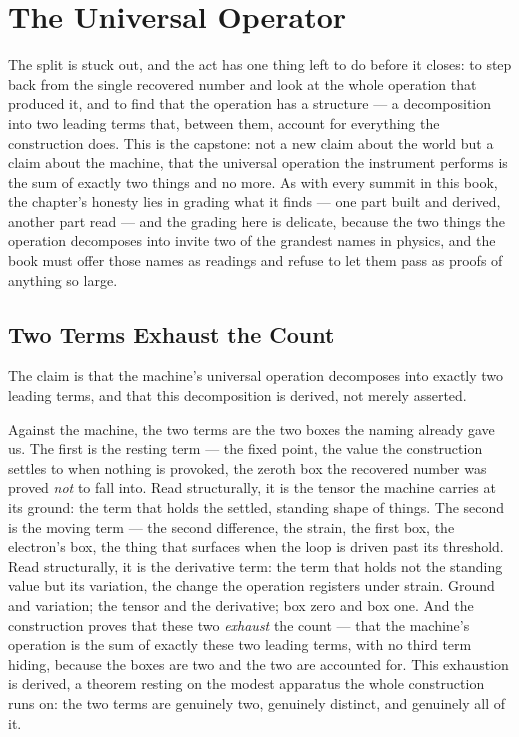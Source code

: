 \chapter{The Universal Operator}

The split is stuck out, and the act has one thing left to do before it closes: to step back from the single
recovered number and look at the whole operation that produced it, and to find that the operation has a
structure --- a decomposition into two leading terms that, between them, account for everything the construction
does. This is the capstone: not a new claim about the world but a claim about the machine, that the universal
operation the instrument performs is the sum of exactly two things and no more. As with every summit in this book,
the chapter's honesty lies in grading what it finds --- one part built and derived, another part read --- and the
grading here is delicate, because the two things the operation decomposes into invite two of the grandest names in
physics, and the book must offer those names as readings and refuse to let them pass as proofs of anything so
large.

\section{Two Terms Exhaust the Count}

The claim is that the machine's universal operation decomposes into exactly two leading terms, and that this
decomposition is derived, not merely asserted.

Against the machine, the two terms are the two boxes the naming already gave us. The first is the resting term ---
the fixed point, the value the construction settles to when nothing is provoked, the zeroth box the recovered
number was proved \emph{not} to fall into. Read structurally, it is the tensor the machine carries at its ground:
the term that holds the settled, standing shape of things. The second is the moving term --- the second
difference, the strain, the first box, the electron's box, the thing that surfaces when the loop is driven past
its threshold. Read structurally, it is the derivative term: the term that holds not the standing value but its
variation, the change the operation registers under strain. Ground and variation; the tensor and the derivative;
box zero and box one. And the construction proves that these two \emph{exhaust} the count --- that the machine's
operation is the sum of exactly these two leading terms, with no third term hiding, because the boxes are two and
the two are accounted for. This exhaustion is derived, a theorem resting on the modest apparatus the whole
construction runs on: the two terms are genuinely two, genuinely distinct, and genuinely all of it.

